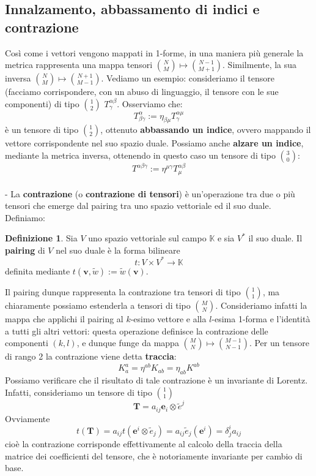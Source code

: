 \documentclass[a4paper,11pt]{book}
\theoremstyle{plain}
\theoremstyle{definition}
\newtheorem{defn}{Definizione}[chapter]
\begin{document}
\subsection{Innalzamento, abbassamento di indici e contrazione}
Così come i vettori vengono mappati in 1-forme, in una maniera più generale la metrica rappresenta una mappa tensori $\binom{N}{M}\mapsto \binom{N-1}{M+1}$. Similmente, la sua inversa $\binom{N}{M} \mapsto \binom{N+1}{M-1}$. Vediamo un esempio: consideriamo il tensore (facciamo corrispondere, con un abuso di linguaggio, il tensore con le sue componenti) di tipo $\binom{1}{2}$ $T^{\alpha\beta}_{\gamma}$. Osserviamo che:
\[
T^{\alpha}_{\beta\gamma} := \eta_{\beta\mu} T^{\alpha\mu}_{\gamma}
\]
è un tensore di tipo $\binom{1}{2}$, ottenuto \textbf{abbassando un indice}, ovvero mappando il vettore corrispondente nel suo spazio duale. Possiamo anche \textbf{alzare un indice}, mediante la metrica inversa, ottenendo in questo caso un tensore di tipo $\binom{3}{0}$:
\[
T^{\alpha\beta\gamma} := \eta^{\mu\gamma} T^{\alpha\beta}_{\mu}
\]
\\-
La \textbf{contrazione} (o \textbf{contrazione di tensori}) è un'operazione tra due o più tensori che emerge dal pairing tra uno spazio vettoriale ed il suo duale. Definiamo:
\begin{defn}
Sia $V$ uno spazio vettoriale sul campo $\mathbb{K}$ e sia $V^*$ il suo duale. Il \textbf{pairing} di $V$ nel suo duale è la forma bilineare
\[
t: V \times V^* \to \mathbb{K}
\]
definita mediante $t( \textbf{v}, \tilde{w} ) := \tilde{w}(\textbf{v})$. 
\end{defn}
Il pairing dunque rappresenta la contrazione tra tensori di tipo $\binom{1}{1}$, ma chiaramente possiamo estenderla a tensori di tipo $\binom{M}{N}$. Consideriamo infatti la mappa che applichi il pairing al $k$-esimo vettore e alla $l$-esima 1-forma e l'identità a tutti gli altri vettori: questa operazione definisce la contrazione delle componenti $(k,l)$, e dunque funge da mappa $\binom{M}{N} \mapsto \binom{M-1}{N-1}$. Per un tensore di rango 2 la contrazione viene detta \textbf{traccia}:
\[
K^a_a = \eta^{ab}K_{ab} = \eta_{ab}K^{ab}
\]
Possiamo verificare che il risultato di tale contrazione è un invariante di Lorentz. Infatti, consideriamo un tensore di tipo $\binom{1}{1}$
\[
\textbf{T} = a_{ij} \textbf{e}_{i} \otimes \tilde{e}^{j}
\]
Ovviamente 
\[ t(\textbf{T})=a_{ij}t(\textbf{e}^{i} \otimes \tilde{e}_{j}) = a_{ij}\tilde{e}_{j}(\textbf{e}^i)=\delta^i_j a_{ij} \]
cioè la contrazione corrisponde effettivamente al calcolo della traccia della matrice dei coefficienti del tensore, che è notoriamente invariante per cambio di base. 
\end{document}
